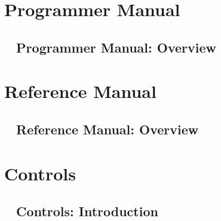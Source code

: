 \documentclass{dabcclass}
\begin{document}
\part{Programmer Manual}
\chapter{\dabc~ Programmer Manual: Overview}
 \cleardoublepage
\part{Reference Manual}
\chapter{\dabc~ Reference Manual: Overview}
 \cleardoublepage
\part{Controls}
\chapter{\dabc~ Controls: Introduction}
 \cleardoublepage

\thispagestyle{empty}
 \cleardoublepage

\end{document}
